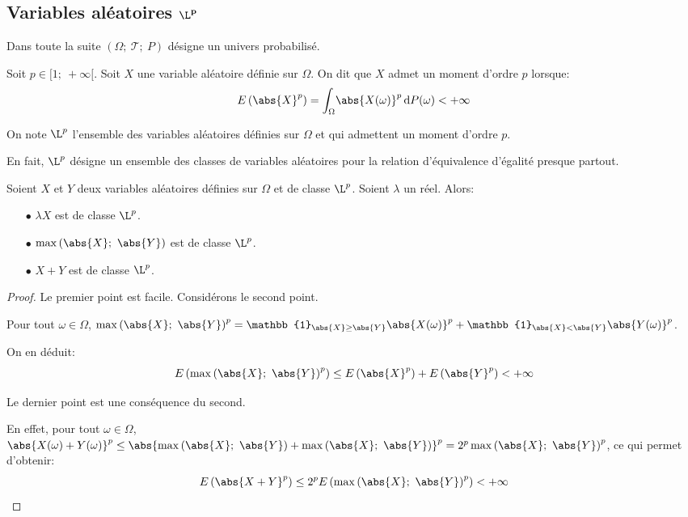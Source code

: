 \subsection{Variables aléatoires $\mathbf{\L^p}$}

Dans toute la suite $\left (\Omega;~\mathcal{T};~P\right )$ désigne un univers probabilisé.

\begin{de}
Soit $p \in [1;~+\infty[$. Soit $X$ une variable aléatoire définie sur $\Omega$. On dit que $X$ admet un moment d'ordre $p$ lorsque:
\[
E\left ( \abs{X}^p\right ) = \displaystyle{\int_{\Omega}} \abs{X(\omega)}^p \, \mathrm d P(\omega) <+\infty
\]

On note $\L^p$ l'ensemble des variables aléatoires définies sur $\Omega$ et qui admettent un moment d'ordre $p$. 

En fait, $\L^p$ désigne un ensemble des classes de variables aléatoires pour la relation d'équivalence d'égalité presque partout.
\end{de}


\begin{prop}
Soient $X$ et $Y$ deux variables aléatoires définies sur $\Omega$ et de classe $\L^p$. Soient $\lambda$ un réel. Alors:
\begin{itemize}
\item[$\bullet$] 
$\lambda X$ est de classe $\L^p$.
\item[$\bullet$] 
$\max\left (\abs{X};~\abs{Y}\right )$ est de classe $\L^p$.
\item[$\bullet$] 
$X+Y$ est de classe $\L^p$.
\end{itemize}
\end{prop}

\begin{proof}
Le premier point est facile. Considérons le second  point. 

Pour tout $\omega \in \Omega$, $\max\left (\abs{X};~\abs{Y}\right )^p = \mathbb{1}_{\abs{X} \geq \abs{Y}} \abs{X(\omega)}^p + \mathbb{1}_{\abs{X} < \abs{Y}} \abs{Y(\omega)}^p$.

On en déduit:
\[
E\left ( \max\left (\abs{X};~\abs{Y}\right )^p \right ) \leq E\left ( \abs{X}^p\right ) + E\left ( \abs{Y}^p\right ) < +\infty
\]

Le dernier point est une conséquence du second. 

En effet, pour tout $\omega \in \Omega$, $\abs{X(\omega)+Y(\omega)}^p \leq \abs{\max\left (\abs{X};~\abs{Y}\right ) + \max\left (\abs{X};~\abs{Y}\right )}^p = 2^p \max\left (\abs{X};~\abs{Y}\right )^p$, ce qui permet d'obtenir:
\[
E\left ( \abs{X+Y}^p \right ) \leq 2^p E\left (\max\left (\abs{X};~\abs{Y}\right )^p\right ) < +\infty
\]
\end{proof}


